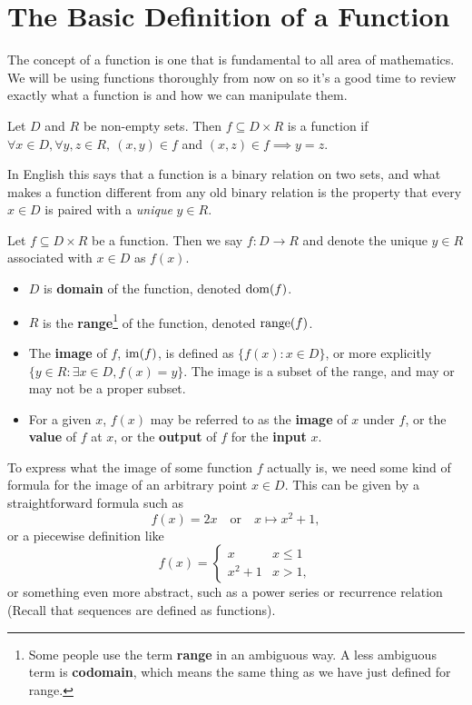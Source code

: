 \documentclass[../real_analysis.tex]{subfiles}
\begin{document}
    \section{The Basic Definition of a Function}
        The concept of a function is one that is fundamental to all area of mathematics. We will be using functions thoroughly from now on so it's a good time to review exactly what a function is and how we can manipulate them.
        \begin{definition}
            Let $D$ and $R$ be non-empty sets. Then $f \subseteq D \times R$ is a function if $\forall x \in D, \forall y, z \in R,\ (x, y) \in f$ and $(x, z) \in f \implies y = z.$
        \end{definition}
        In English this says that a function is a binary relation on two sets, and what makes a function different from any old binary relation is the property that every $x \in D$ is paired with a \textit{unique} $y \in R$.
        \begin{definition}
            Let $f \subseteq D \times R$ be a function.
            Then we say $f: D \to R$ and denote the unique $y \in R$ associated with $x \in D$ as $f(x)$.
            \begin{itemize}
                \item $D$ is \textbf{domain} of the function, denoted $\operatorname{dom}(f)$.
                \item $R$ is the \textbf{range}\footnote{Some people use the term \textbf{range} in an ambiguous way. A less ambiguous term is \textbf{codomain}, which means the same thing as we have just defined for range.} of the function, denoted $\operatorname{range}(f)$.
                \item The \textbf{image} of $f$, $\operatorname{im}(f)$, is defined as ${\{f(x):x \in D\}}$, or more explicitly ${\{y \in R : \exists x \in D, f(x)=y\}}$. The image is a subset of the range, and may or may not be a proper subset.
                \item For a given $x$, $f(x)$ may be referred to as the \textbf{image} of $x$ under $f$, or the \textbf{value} of $f$ at $x$, or the \textbf{output} of $f$ for the \textbf{input} $x$.
            \end{itemize}
        \end{definition}
        To express what the image of some function $f$ actually is, we need some kind of formula for the image of an arbitrary point $x \in D$. This can be given by a straightforward formula such as
        \begin{equation}
            f(x) = 2x \quad \text{or}\quad x \mapsto x^2 + 1,
        \end{equation}
        or a piecewise definition like
        \begin{equation}\label{eq:4.1}
            f(x) = \begin{cases}
                        x & x \leq 1 \\
                        x^2 + 1 & x > 1,
                    \end{cases}
        \end{equation}
        or something even more abstract, such as a power series or recurrence relation (Recall that sequences are defined as functions).
\end{document}
